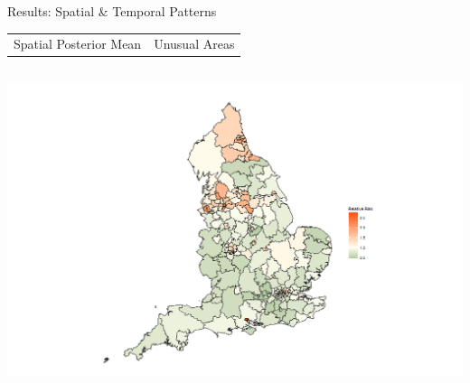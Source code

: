 \documentclass[slidestop,compress,serif,10pt]{beamer}
\begin{document}
\begin{frame}{Results: Spatial \& Temporal Patterns}

\begin{tabular}{m{5cm}m{5cm}}
\footnotesize{Spatial Posterior Mean} & \hspace{30pt}\footnotesize{Unusual Areas}\\
\end{tabular}
\begin{columns}
\begin{column}{0.5\textwidth}               
\includegraphics[width=\textwidth]{RRmap}
\end{column}


\end{columns}
\end{frame}
\end{document}
